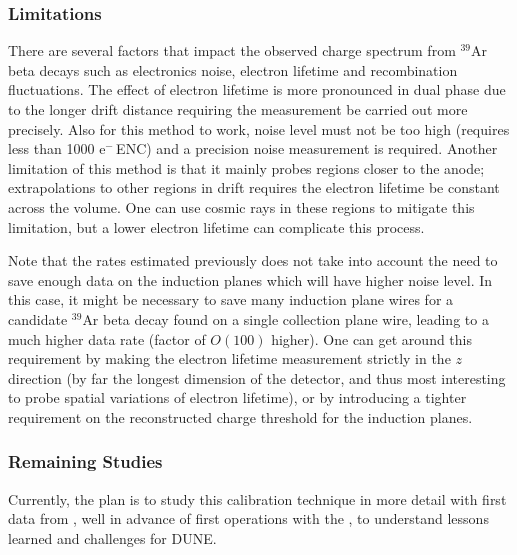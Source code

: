 \subsubsection{Limitations}
There are several factors that impact the observed charge spectrum from 
${}^{39}$Ar beta decays such as electronics noise, electron lifetime and recombination fluctuations. The effect of electron lifetime is more pronounced in dual phase due to the longer drift distance requiring the measurement be carried out more precisely. Also for this method to work, noise level must not be too high (requires less than \num{1000} e$^{-}$\,ENC) and a precision noise measurement is required. Another limitation of this method is that it mainly probes regions closer to the anode; extrapolations to other regions in drift requires the electron lifetime be constant across the volume. One can use cosmic rays in these regions to mitigate this limitation, but a lower electron lifetime can complicate this process. 

Note that the  rates estimated previously does not take into account the need to save enough data on the induction planes which will have higher noise level. In this case, it might be necessary to save many induction plane wires for a candidate ${}^{39}$Ar beta decay found on a single collection plane wire, leading to a much higher data rate (factor of $O(100)$ higher). One can get around this requirement by making the electron lifetime measurement strictly in the $z$ direction (by far the longest dimension of the detector, and thus most interesting to probe spatial variations of electron lifetime), or by introducing a tighter requirement on the reconstructed charge threshold for the induction planes.

\subsubsection{Remaining Studies}
Currently, the plan is to study this calibration technique in more detail with first data from , well in advance of first operations with the , to understand lessons learned and challenges for DUNE.  

